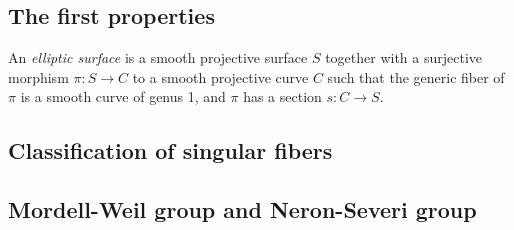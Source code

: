 \subsection{The first properties}

    \begin{definition}\label{def:elliptic_surface}
        An \emph{elliptic surface} is a smooth projective surface \(S\) together with a surjective morphism \(\pi:S\to C\) to a smooth projective curve \(C\) such that the generic fiber of \(\pi\) is a smooth curve of genus 1, and \(\pi\) has a section \(s:C\to S\).
    \end{definition}

\subsection{Classification of singular fibers}


\subsection{Mordell-Weil group and Neron-Severi group}
